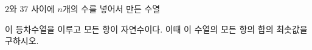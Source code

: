$2$와 $37$ 사이에 $n$개의 수를 넣어서 만든 수열 \par\smallskip{}\par\smallskip\noindent 이 등차수열을 이루고 모든 항이 자연수이다. 이때 이 수열의 모든 항의 합의 최솟값을 구하시오.
